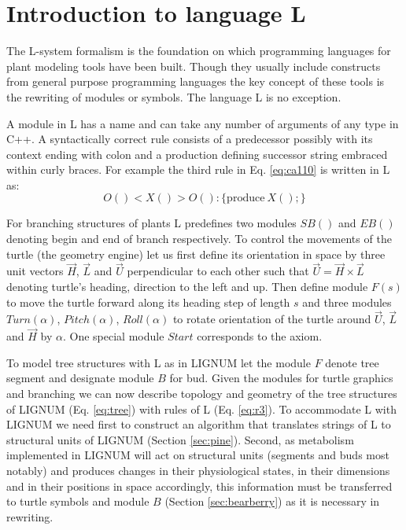 \section{Introduction to language L}

The  L-system  formalism  is   the  foundation  on  which  programming
languages  for  plant modeling  tools  have  been  built. Though  they
usually include constructs  from general purpose programming languages
the key concept of these tools is the rewriting of modules or symbols.
The language L is no exception.

A module in L  has a name and can take any  number of arguments of any
type in C++.   A syntactically correct rule consists  of a predecessor
possibly with its context ending  with colon and a production defining
successor string embraced within  curly braces.  For example the third
rule in Eq.  \ref{eq:ca110} is written in L as:
\begin{equation}\label{eq:r3}
 O() < X() > O(): \{\mathrm{produce}\ X();\}
\end{equation}

For branching structures of plants L predefines two modules $SB()$ and
$EB()$ denoting begin and end  of branch respectively.  To control the
movements of the turtle (the  geometry engine) let us first define its
orientation  in space by  three unit  vectors $\vec  H$, $\vec  L$ and
$\vec U$ perpendicular to each other such that $\vec U = \vec H \times
\vec L$ denoting turtle's heading,  direction to the left and up. Then
define module $F(s)$ to move the turtle forward along its heading step
of  length  $s$  and  three modules  $Turn(\alpha)$,  $Pitch(\alpha)$,
$Roll(\alpha)$ to  rotate orientation of  the turtle around  $\vec U$,
$\vec  L$  and $\vec  H$  by  $\alpha$.   One special  module  $Start$
corresponds to the axiom.

To model tree structures with L as in LIGNUM let the module $F$ denote
tree segment and designate module  $B$ for bud.  Given the modules for
turtle  graphics  and  branching  we  can now  describe  topology  and
geometry of  the tree structures  of LIGNUM (Eq.   \ref{eq:tree}) with
rules of  L (Eq.  \ref{eq:r3}). To  accommodate L with  LIGNUM we need
first  to construct  an  algorithm  that translates  strings  of L  to
structural  units  of  LIGNUM  (Section \ref{sec:pine}).   Second,  as
metabolism  implemented  in  LIGNUM   will  act  on  structural  units
(segments  and  buds  most  notably)  and produces  changes  in  their
physiological states,  in their dimensions  and in their  positions in
space  accordingly, this  information  must be  transferred to  turtle
symbols  and  module  $B$   (Section  \ref{sec:bearberry})  as  it  is
necessary in rewriting.

